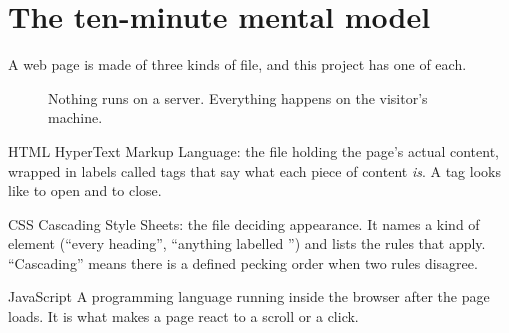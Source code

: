 \documentclass[11pt,a4paper]{article}
\begin{document}
\section{The ten-minute mental model}

A web page is made of three kinds of file, and this project has one of each.

\begin{figure}[H]\centering
{}
\caption{Nothing runs on a server. Everything happens on the visitor's machine.}
\end{figure}

\begin{jargon}{HTML}
HyperText Markup Language: the file holding the page's actual content, wrapped in
labels called tags that say what each piece of content \emph{is}. A tag looks like
 to open and  to close.
\end{jargon}

\begin{jargon}{CSS}
Cascading Style Sheets: the file deciding appearance. It names a kind of element
(``every heading'', ``anything labelled '') and lists the rules that
apply. ``Cascading'' means there is a defined pecking order when two rules
disagree.
\end{jargon}

\begin{jargon}{JavaScript}
A programming language running inside the browser after the page loads. It is
what makes a page react to a scroll or a click.
\end{jargon}
\end{document}
